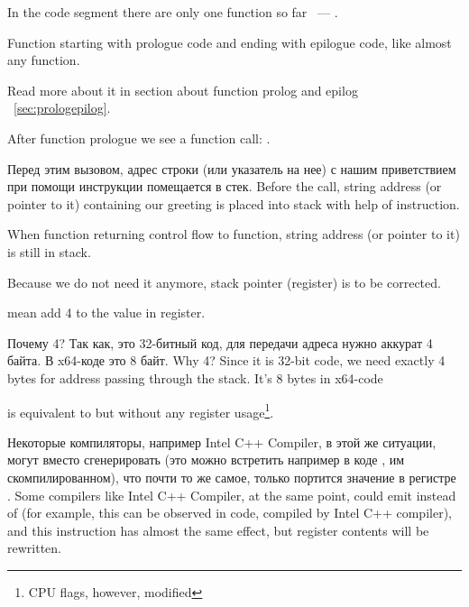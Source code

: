 {In the code segment  there are only one function so far ~--- .}

{Function  starting with prologue code and ending with epilogue code, like almost any function.}

{Read more about it in section about function prolog and epilog}
~\ref{sec:prologepilog}.

{After function prologue we see a function \printf call}: . 

\IFRU
{Перед этим вызовом, адрес строки (или указатель на нее) с нашим приветствием при помощи инструкции \PUSH помещается в стек.}
{Before the call, string address (or pointer to it) containing our greeting is placed into stack with help of \PUSH instruction.}

{When \printf function returning control flow to \main function, string address (or pointer to it) is still in stack.}

{Because we do not need it anymore, stack pointer (\ESP register) is to be corrected.}

 
{mean add 4 to the value in \ESP register.}

\IFRU
{Почему 4? Так как, это 32-битный код, для передачи адреса нужно аккурат 4 байта. В x64-коде это 8 байт.}
{Why 4? Since it is 32-bit code, we need exactly 4 bytes for address passing through the stack. 
It's 8 bytes in x64-code}

 
{is equivalent to  but without any register usage\footnote{CPU flags, however, modified}.}

\IFRU
{Некоторые компиляторы, например Intel C++ Compiler, в этой же ситуации, могут вместо 
\ADD сгенерировать  (это можно встретить например в коде \oracle{}, им скомпилированном), 
что почти то же самое, только портится значение в регистре \ECX.}
{Some compilers like Intel C++ Compiler, at the same point, could emit  
instead of \ADD (for example, this can be observed in \oracle{} code, compiled by Intel C++ compiler), 
and this instruction has almost the same effect, but \ECX register contents will be rewritten.}


